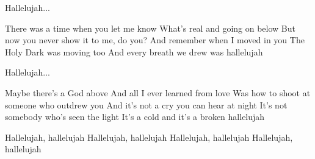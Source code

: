 \documentclass[../../../songbook.tex]{subfiles}
\begin{document}
{\-\hspace{1cm} Hallelujah... \newline
 
There was a time when you let me know  \newline
What’s real and going on below  \newline
But now you never show it to me, do you?  \newline
And remember when I moved in you  \newline
The Holy Dark was moving too  \newline
And every breath we drew was hallelujah  \newline

\-\hspace{1cm} Hallelujah... \newline
 
Maybe there’s a God above  \newline
And all I ever learned from love  \newline
Was how to shoot at someone who outdrew you  \newline
And it’s not a cry you can hear at night  \newline
It’s not somebody who’s seen the light  \newline
It’s a cold and it’s a broken hallelujah  \newline

\-\hspace{1cm} Hallelujah, hallelujah	 \newline
\-\hspace{1cm} Hallelujah, hallelujah	 \newline
\-\hspace{1cm} Hallelujah, hallelujah	 \newline
\-\hspace{1cm} Hallelujah, hallelujah	 \newline
}
\end{document}
